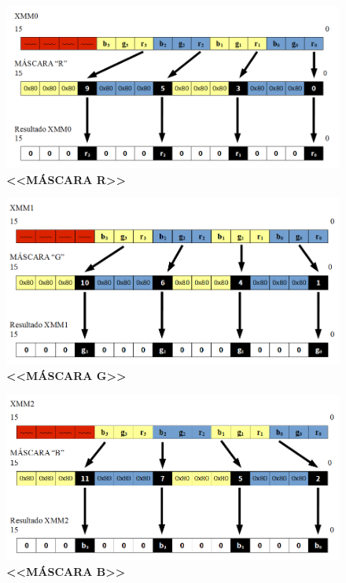 \begin{figure}[h]
  \begin{center}
  \includegraphics[scale=0.55]{imagenes/popart-mask-r.png}
  \caption{\textbf{<<MÁSCARA R>>}}
  \label{fig:popart_mask_r}
  \end{center}
\end{figure}

\begin{figure}[h]
  \begin{center}
  \includegraphics[scale=0.55]{imagenes/popart-mask-g.png}
  \caption{\textbf{<<MÁSCARA G>>}}
  \label{fig:popart_mask_g}
  \end{center}
\end{figure}

\begin{figure}[h]
  \begin{center}
  \includegraphics[scale=0.55]{imagenes/popart-mask-b.png}
  \caption{\textbf{<<MÁSCARA B>>}}
  \label{fig:popart_mask_b}
  \end{center}
\end{figure}


